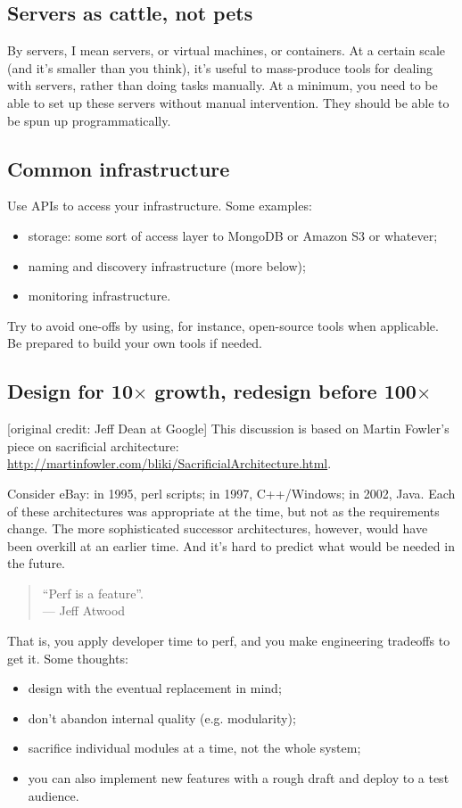 \documentclass[a4paper]{report}
\begin{document}
\subsection*{Servers as cattle, not pets}
By servers, I mean servers, or virtual machines, or containers.
At a certain scale (and it's smaller than you think), it's useful to
mass-produce tools for dealing with servers, rather than doing tasks
manually. At a minimum, you need to be able to set up these servers
without manual intervention. They should be able to be spun up 
programmatically.

\subsection*{Common infrastructure}
Use APIs to access your infrastructure. Some examples:
\begin{itemize}
\item storage: some sort of access layer to MongoDB or Amazon S3 or whatever;
\item naming and discovery infrastructure (more below);
\item monitoring infrastructure.
\end{itemize}
Try to avoid one-offs by using, for instance, open-source tools when applicable.
Be prepared to build your own tools if needed.

\subsection*{Design for 10$\times$ growth, redesign before 100$\times$}
[original credit: Jeff Dean at Google] This discussion is based on
Martin Fowler's piece on sacrificial architecture:
\url{http://martinfowler.com/bliki/SacrificialArchitecture.html}.

Consider eBay: in 1995, perl scripts; in 1997, C++/Windows; in 2002,
Java.  Each of these architectures was appropriate at the time, but
not as the requirements change. The more sophisticated successor
architectures, however, would have been overkill at an earlier
time. And it's hard to predict what would be needed in the future.

\begin{quote}
``Perf is a feature''.\\
\hfill --- Jeff Atwood
\end{quote}
That is, you apply developer time to perf, and you make engineering tradeoffs
to get it. Some thoughts:
\begin{itemize}
\item design with the eventual replacement in mind;
\item don't abandon internal quality (e.g. modularity);
\item sacrifice individual modules at a time, not the whole system;
\item you can also implement new features with a rough draft and deploy to a test audience.
\end{itemize}
\end{document}
